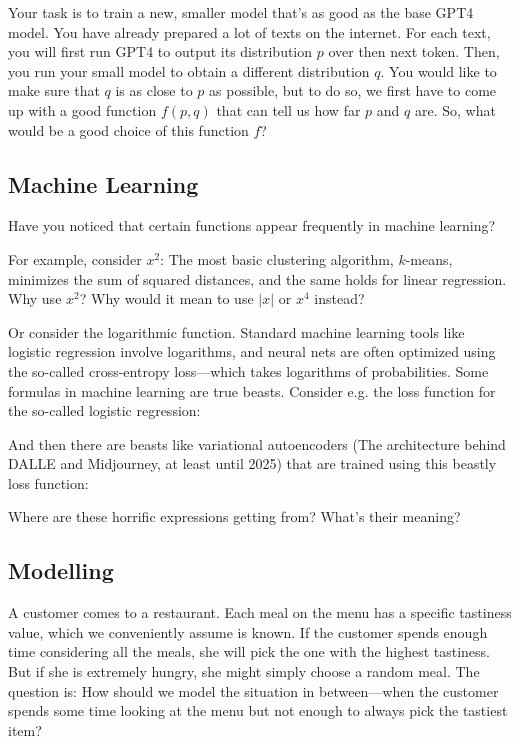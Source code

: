 \documentclass{article}
\begin{document}
Your task is to train a new, smaller model that's as good as the base GPT4 model. You have already prepared a lot of texts on the internet. For each text, you will first run GPT4 to output its distribution $p$ over then next token. Then, you run your small model to obtain a different distribution $q$. You would like to make sure that $q$ is as close to $p$ as possible, but to do so, we first have to come up with a good function $f(p,q)$ that can tell us how far $p$ and $q$ are. So, what would be a good choice of this function $f$? 


\subsection{Machine Learning}

Have you noticed that certain functions appear frequently in machine learning?

For example, consider \(x^2\): The most basic clustering algorithm, \(k\)-means, minimizes the sum of squared distances, and the same holds for linear regression. Why use \(x^2\)? Why would it mean to use \(|x|\) or \(x^4\) instead?

Or consider the logarithmic function. Standard machine learning tools like logistic regression involve logarithms, and neural nets are often optimized using the so-called cross-entropy loss—which takes logarithms of probabilities. %
Some formulas in machine learning are true beasts. Consider e.g. the loss function for the so-called logistic regression:


And then there are beasts like variational autoencoders (The architecture behind DALLE and Midjourney, at least until 2025) that are trained using this beastly loss function:

Where are these horrific expressions getting from? What's their meaning?



\subsection{Modelling}


A customer comes to a restaurant. Each meal on the menu has a specific tastiness value, which we conveniently assume is known. If the customer spends enough time considering all the meals, she will pick the one with the highest tastiness. But if she is extremely hungry, she might simply choose a random meal. The question is: How should we model the situation in between—when the customer spends some time looking at the menu but not enough to always pick the tastiest item?
\end{document}
